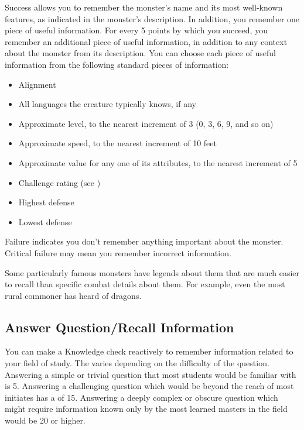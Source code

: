         Success allows you to remember the monster's name and its most well-known features, as indicated in the monster's description.
        In addition, you remember one piece of useful information.
        For every 5 points by which you succeed, you remember an additional piece of useful information, in addition to any context about the monster from its description.
        You can choose each piece of useful information from the following standard pieces of information:
        \begin{itemize}
            \item Alignment
            \item All languages the creature typically knows, if any
            \item Approximate level, to the nearest increment of 3 (0, 3, 6, 9, and so on)
            \item Approximate speed, to the nearest increment of 10 feet
            \item Approximate value for any one of its attributes, to the nearest increment of 5
            \item Challenge rating (see )
            \item Highest defense
            \item Lowest defense
        \end{itemize}

        Failure indicates you don't remember anything important about the monster.
        Critical failure may mean you remember incorrect information.

        Some particularly famous monsters have legends about them that are much easier to recall than specific combat details about them.
        For example, even the most rural commoner has heard of dragons.

    \subsection{Answer Question/Recall Information}
        You can make a Knowledge check reactively to remember information related to your field of study. The  varies depending on the difficulty of the question. Answering a simple or trivial question that most students would be familiar with is  5. Answering a challenging question which would be beyond the reach of most initiates has a  of 15. Answering a deeply complex or obscure question which might require information known only by the most learned masters in the field would be  20 or higher.


